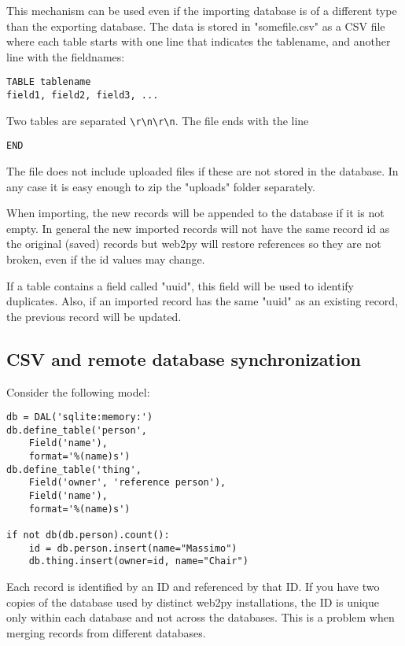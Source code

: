 \documentclass[justified,sixbynine,notoc]{tufte-book}
\def\ft{\small\tt}
\begin{document}
\begin{fullwidth}
This mechanism can be used even if the importing database is of a different type than the exporting database. The data is stored in "somefile.csv" as a CSV file where each table starts with one line that indicates the tablename, and another line with the fieldnames:
\begin{lstlisting}
TABLE tablename
field1, field2, field3, ...
\end{lstlisting}

Two tables are separated {\ft {\textbackslash}r{\textbackslash}n{\textbackslash}r{\textbackslash}n}. The file ends with the line
\begin{lstlisting}
END
\end{lstlisting}

The file does not include uploaded files if these are not stored in the database. In any case it is easy enough to zip the "uploads" folder separately.

When importing, the new records will be appended to the database if it is not empty. In general the new imported records will not have the same record id as the original (saved) records but web2py will restore references so they are not broken, even if the id values may change.

If a table contains a field called
"uuid", this field will be used to identify duplicates.  Also, if an
imported record has the same "uuid" as an existing record, the
previous record will be updated.

\goodbreak\subsection{CSV and remote database synchronization}

Consider the following model:
\begin{lstlisting}
db = DAL('sqlite:memory:')
db.define_table('person',
    Field('name'),
    format='%(name)s')
db.define_table('thing',
    Field('owner', 'reference person'),
    Field('name'),
    format='%(name)s')

if not db(db.person).count():
    id = db.person.insert(name="Massimo")
    db.thing.insert(owner=id, name="Chair")
\end{lstlisting}

Each record is identified by an ID and referenced by that ID. If you
have two copies of the database used by distinct web2py installations,
the ID is unique only within each database and not across the databases.
This is a problem when merging records from different databases.


\end{fullwidth}
\end{document}

